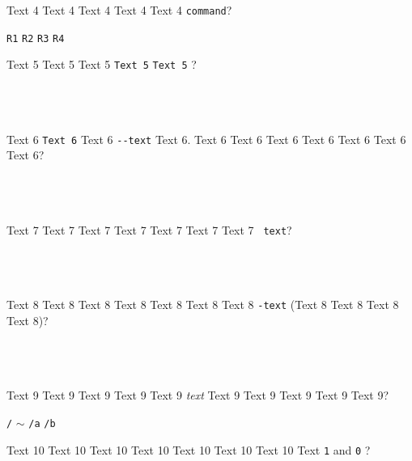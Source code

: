 \documentclass[9pt]{exam}
\begin{document}
\begin{questions}
\question
    Text 4 Text 4 Text 4 Text 4 Text 4 \texttt{command}?\\
    \begin{oneparchoices}
     \choice \texttt{R1}
     \choice \texttt{R2}
     \choice \texttt{R3}
     \choice \texttt{R4}
    \end{oneparchoices}

\question
    Text 5 Text 5 Text 5 \textquotedbl{}\texttt{Text 5}\textquotedbl{} 
    \textquotedbl{}\texttt{Text 5}\textquotedbl{} ?\\\\
    \makebox[0.9\textwidth]{\$ \enspace\hrulefill}\\\\
    \makebox[0.9\textwidth]{\enspace\hrulefill}

\question
    Text 6 \texttt{Text 6} Text 6 \texttt{-{}-text} Text 6.
    Text 6 Text 6 Text 6 Text 6 Text 6 Text 6 Text 6?\\\\
    \makebox[0.9\textwidth]{\$ \enspace\hrulefill}\\\\
    \makebox[0.9\textwidth]{\enspace\hrulefill}

\question
    Text 7 Text 7 Text 7 Text 7 Text 7 Text 7 Text 7
    \texttt{\textquotesingle{} text\textquotesingle{}}?\\\\
    \makebox[0.9\textwidth]{\$ \enspace\hrulefill}\\\\
    \makebox[0.9\textwidth]{\enspace\hrulefill}

\question
    Text 8 Text 8 Text 8 Text 8 Text 8 Text 8 Text 8
    \texttt{\textquotesingle{}-text\textquotesingle{}}
    (Text 8 Text 8 Text 8 Text 8)?\\\\
    \makebox[0.9\textwidth]{\$ \enspace\hrulefill}\\\\
    \makebox[0.9\textwidth]{\enspace\hrulefill}

\question
    Text 9 Text 9 Text 9 Text 9 Text 9 \emph{text}
    Text 9 Text 9 Text 9 Text 9 Text 9?\\
    \begin{oneparchoices}
     \choice \texttt{/}
     \choice \texttt{$\sim$}
     \choice \texttt{/a}
     \choice \texttt{/b}
    \end{oneparchoices}

\question
    Text 10 Text 10 Text 10 Text 10 Text 10 Text 10 Text 10
    Text \texttt{1} and \texttt{0} ?\\\\
    \makebox[0.9\textwidth]{\$ \enspace\hrulefill}\\\\
    \makebox[0.9\textwidth]{\enspace\hrulefill}


\end{questions}
\end{document}
